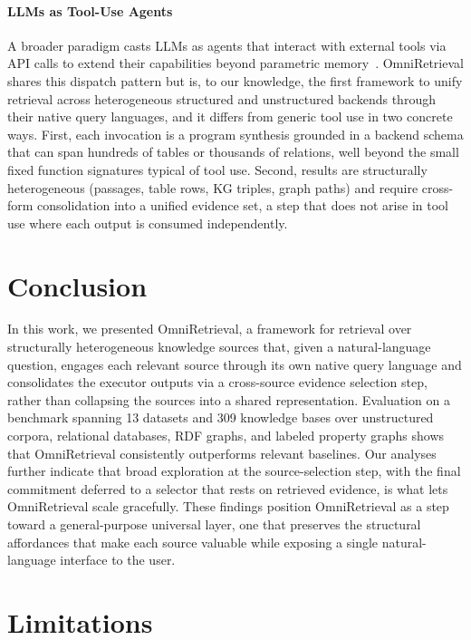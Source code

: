 \documentclass{llmxive}
\begin{document}
\paragraph{LLMs as Tool-Use Agents}
A broader paradigm casts LLMs as agents that interact with external tools via API calls to extend their capabilities beyond parametric memory~\citep{ReAct, Toolformer, ToolLLM, Gorilla}. OmniRetrieval shares this dispatch pattern but is, to our knowledge, the first framework to unify retrieval across heterogeneous structured and unstructured backends through their native query languages, and it differs from generic tool use in two concrete ways. First, each invocation is a program synthesis grounded in a backend schema that can span hundreds of tables or thousands of relations, well beyond the small fixed function signatures typical of tool use. Second, results are structurally heterogeneous (passages, table rows, KG triples, graph paths) and require cross-form consolidation into a unified evidence set, a step that does not arise in tool use where each output is consumed independently.

\section{Conclusion}

In this work, we presented OmniRetrieval, a framework for retrieval over structurally heterogeneous knowledge sources that, given a natural-language question, engages each relevant source through its own native query language and consolidates the executor outputs via a cross-source evidence selection step, rather than collapsing the sources into a shared representation. Evaluation on a benchmark spanning 13 datasets and 309 knowledge bases over unstructured corpora, relational databases, RDF graphs, and labeled property graphs shows that OmniRetrieval consistently outperforms relevant baselines. Our analyses further indicate that broad exploration at the source-selection step, with the final commitment deferred to a selector that rests on retrieved evidence, is what lets OmniRetrieval scale gracefully. These findings position OmniRetrieval as a step toward a general-purpose universal layer, one that preserves the structural affordances that make each source valuable while exposing a single natural-language interface to the user.

\section*{Limitations}
\end{document}
